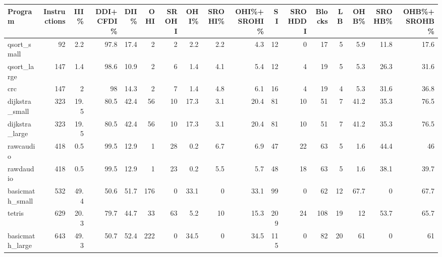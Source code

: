\begin{tabular}{lrrrrrrrrrrrrrrrr}
\hline
 Program         &   Instructions &   III\% &   DDI+CFDI\% &   DII\% &   OHI &   SROHI &   OHI\% &   SROHI\% &   OHI\%+SROHI\% &   SI &   SROHDDI &   Blocks &   LB &   OHB\% &   SROHB\% &   OHB\%+SROHB\% \\
\hline
 qsort\_small     &             92 &    2.2 &        97.8 &   17.4 &     2 &       2 &    2.2 &      2.2 &           4.3 &   12 &         0 &       17 &    5 &    5.9 &     11.8 &          17.6 \\
 qsort\_large     &            147 &    1.4 &        98.6 &   10.9 &     2 &       6 &    1.4 &      4.1 &           5.4 &   12 &         4 &       19 &    5 &    5.3 &     26.3 &          31.6 \\
 crc             &            147 &    2   &        98   &   14.3 &     2 &       7 &    1.4 &      4.8 &           6.1 &   16 &         4 &       19 &    4 &    5.3 &     31.6 &          36.8 \\
 dijkstra\_small  &            323 &   19.5 &        80.5 &   42.4 &    56 &      10 &   17.3 &      3.1 &          20.4 &   81 &        10 &       51 &    7 &   41.2 &     35.3 &          76.5 \\
 dijkstra\_large  &            323 &   19.5 &        80.5 &   42.4 &    56 &      10 &   17.3 &      3.1 &          20.4 &   81 &        10 &       51 &    7 &   41.2 &     35.3 &          76.5 \\
 rawcaudio       &            418 &    0.5 &        99.5 &   12.9 &     1 &      28 &    0.2 &      6.7 &           6.9 &   47 &        22 &       63 &    5 &    1.6 &     44.4 &          46   \\
 rawdaudio       &            418 &    0.5 &        99.5 &   12.9 &     1 &      23 &    0.2 &      5.5 &           5.7 &   48 &        18 &       63 &    5 &    1.6 &     38.1 &          39.7 \\
 basicmath\_small &            532 &   49.4 &        50.6 &   51.7 &   176 &       0 &   33.1 &      0   &          33.1 &   99 &         0 &       62 &   12 &   67.7 &      0   &          67.7 \\
 tetris          &            629 &   20.3 &        79.7 &   44.7 &    33 &      63 &    5.2 &     10   &          15.3 &  209 &        24 &      108 &   19 &   12   &     53.7 &          65.7 \\
 basicmath\_large &            643 &   49.3 &        50.7 &   52.4 &   222 &       0 &   34.5 &      0   &          34.5 &  115 &         0 &       82 &   20 &   61   &      0   &          61   \\

\end{tabular}

